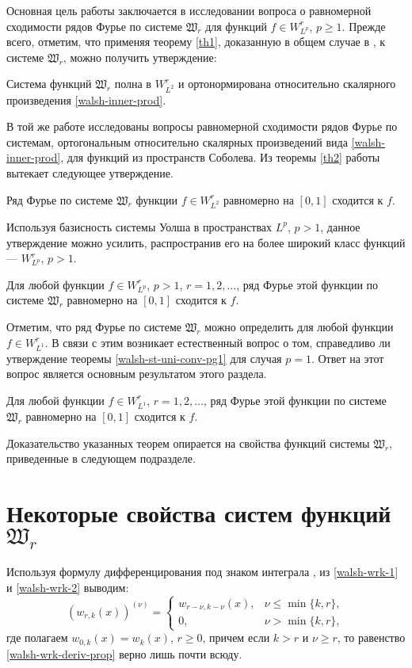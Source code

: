 Основная цель работы заключается в исследовании вопроса о равномерной сходимости рядов Фурье по системе $\mathfrak{W}_r$ для функций $f \in W^r_{L^p}$, $p \ge 1$.
Прежде всего, отметим, что применяя теорему \ref{th1}, доказанную в общем случае в \cite{SharIzv2018}, к системе $\mathfrak{W}_r$, можно получить утверждение:
\begin{statement}
	Система функций $\mathfrak{W}_r$ полна в $W_{L^2}^r$ и ортонормирована относительно скалярного произведения \eqref{walsh-inner-prod}.
\end{statement}
В той же работе исследованы вопросы равномерной сходимости рядов Фурье по системам, ортогональным относительно скалярных произведений вида \eqref{walsh-inner-prod}, для функций из пространств Соболева. Из теоремы \ref{th2} работы \cite{SharIzv2018} вытекает следующее утверждение.
\begin{statement}
	Ряд Фурье по системе $\mathfrak{W}_r$ функции $f \in W_{L^2}^r$ равномерно на $[0,1]$ сходится к $f$.
\end{statement}



Используя базисность системы Уолша в пространствах $L^p$, $p>1$, данное утверждение можно усилить, распространив его на более широкий класс функций --- $W^r_{L^p}$, $p>1$.
\begin{theorem}\label{walsh-st-uni-conv-pg1}
	Для любой функции $f \in W_{L^p}^r$, $p>1$, $r=1,2,\ldots$, ряд Фурье этой функции по системе $\mathfrak{W}_r$ равномерно на $[0,1]$ сходится к $f$.
\end{theorem}

Отметим, что ряд Фурье по системе $\mathfrak{W}_r$ можно определить для любой функции $f \in W^r_{L^1}$. В связи с этим возникает естественный вопрос о том, справедливо ли утверждение теоремы \ref{walsh-st-uni-conv-pg1} для случая $p=1$. Ответ на этот вопрос является основным результатом этого раздела.
\begin{theorem}\label{walsh-st-main}
	Для любой функции $f \in W_{L^1}^r$, $r=1,2,\ldots$, ряд Фурье этой функции по системе $\mathfrak{W}_r$ равномерно на $[0,1]$ сходится к $f$.
\end{theorem}

Доказательство указанных теорем опирается на свойства функций системы $\mathfrak{W}_r$, приведенные в следующем подразделе.

\section{Некоторые свойства систем функций $\mathfrak{W}_r$}\label{walsh-sec-Wr-props}
Используя формулу дифференцирования под знаком интеграла \cite{walsh-fiht2}, из \eqref{walsh-wrk-1} и \eqref{walsh-wrk-2} выводим:
\begin{equation}\label{walsh-wrk-deriv-prop}
(w_{r,k}(x))^{(\nu)} =
\begin{cases}
w_{r-\nu,k-\nu}(x), &\nu \le \min\{k,r\},\\
0, &\nu > \min\{k,r\},
\end{cases}
\end{equation}
где полагаем $w_{0,k}(x)=w_{k}(x)$, $r \ge 0$, причем если $k > r$ и $\nu \ge r$, то равенство \eqref{walsh-wrk-deriv-prop} верно лишь почти всюду.

